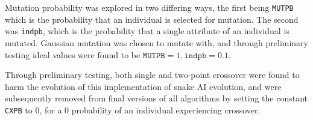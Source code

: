 Mutation probability was explored in two differing ways, the first being \texttt{MUTPB} which is the probability that an individual is selected for mutation. The second was \texttt{indpb}, which is the probability that a single attribute of an individual is mutated. Gaussian mutation was chosen to mutate with, and through preliminary testing ideal values were found to be $\texttt{MUTPB} = 1, \texttt{indpb} = 0.1$.

Through preliminary testing, both single and two-point crossover were found to harm the evolution of this implementation of snake AI evolution, and were subsequently removed from final versions of all algorithms by setting the constant \texttt{CXPB} to 0, for a 0 probability of an individual experiencing crossover.